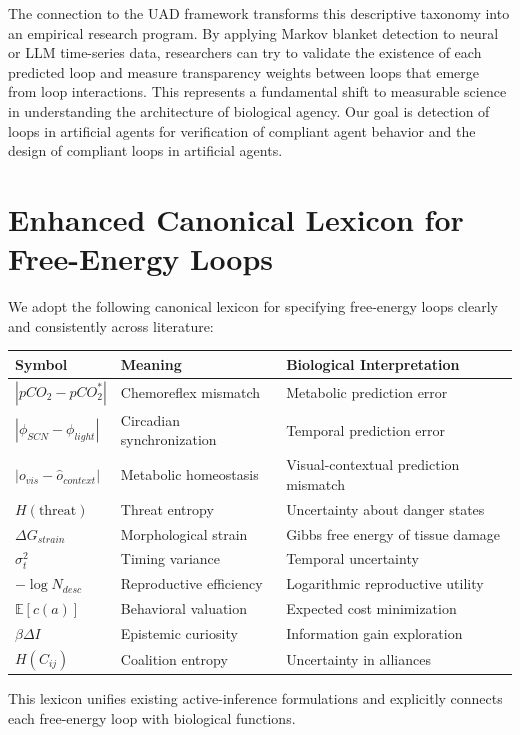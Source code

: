 \documentclass[11pt]{article}
\begin{document}
The connection to the UAD framework transforms this descriptive taxonomy into an empirical research program. By applying Markov blanket detection to neural or LLM time-series data, researchers can try to validate the existence of each predicted loop and measure transparency weights between loops that emerge from loop interactions. 
This represents a fundamental shift to measurable science in understanding the architecture of biological agency.
Our goal is detection of loops in artificial agents for verification of compliant agent behavior and the design of compliant loops in artificial agents.

\section{Enhanced Canonical Lexicon for Free-Energy Loops}
We adopt the following canonical lexicon for specifying free-energy loops clearly and consistently across literature:

\begin{tabular}{lll}
\textbf{Symbol} & \textbf{Meaning} & \textbf{Biological Interpretation} \\
\hline
$|pCO_2 - pCO_2^*|$ & Chemoreflex mismatch & Metabolic prediction error \\
$|\phi_{SCN} - \phi_{light}|$ & Circadian synchronization & Temporal prediction error \\
$|o_{vis} - \hat{o}_{context}|$ & Metabolic homeostasis & Visual-contextual prediction mismatch \\
$H(\text{threat})$ & Threat entropy & Uncertainty about danger states \\
$\Delta G_{strain}$ & Morphological strain & Gibbs free energy of tissue damage \\
$\sigma^2_t$ & Timing variance & Temporal uncertainty \\
$-\log N_{desc}$ & Reproductive efficiency & Logarithmic reproductive utility \\
$\mathbb{E}[c(a)]$ & Behavioral valuation & Expected cost minimization \\
$\beta \Delta I$ & Epistemic curiosity & Information gain exploration \\
$H(C_{ij})$ & Coalition entropy & Uncertainty in alliances \\
\hline
\end{tabular}

This lexicon unifies existing active-inference formulations \cite{ramstead2022bayesian} and explicitly connects each free-energy loop with biological functions.



\end{document}
